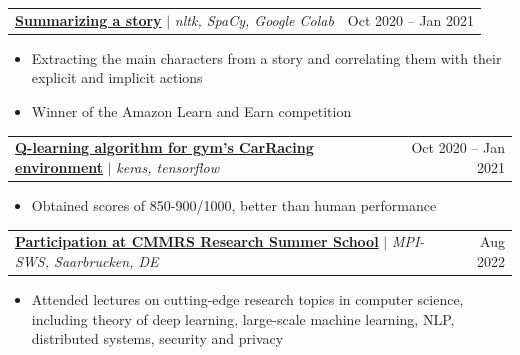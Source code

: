 \documentclass[letterpaper,11pt]{article}
\makeatletter
\newcommand{\resumeItem}[1]{
  \item\small{
    {#1 \vspace{-2pt}}
  }
}
\newcommand{\resumeProjectHeading}[2]{
    \item
    \begin{tabular*}{0.97\textwidth}{l@{\extracolsep{\fill}}r}
      \small#1 & #2 \\
    \end{tabular*}\vspace{-7pt}
}
\newcommand{\resumeItemListStart}{\begin{itemize}}
\newcommand{\resumeItemListEnd}{\end{itemize}\vspace{-5pt}}
\makeatother
\begin{document}

        
    \resumeProjectHeading
        {\textbf{\href{ https://colab.research.google.com/drive/1_yDVONNKSRI_GoF7pYY1lVmAcwNZGF8n?usp=sharing}{Summarizing a story}}  $|$ \emph{nltk, SpaCy, Google Colab}}{Oct 2020 -- Jan 2021}
        \resumeItemListStart
            \resumeItem{Extracting the main characters from a story and correlating them with their explicit and implicit actions}
            \resumeItem{Winner of the Amazon Learn and Earn competition}
        \resumeItemListEnd

    \resumeProjectHeading
        {\textbf{\href{ https://github.com/stefanrzv2000/gym}{Q-learning algorithm for gym's CarRacing environment}}  $|$ \emph{keras, tensorflow}}{Oct 2020 -- Jan 2021}
        \resumeItemListStart
            \resumeItem{Obtained scores of 850-900/1000, better than human performance}
        \resumeItemListEnd

    \resumeProjectHeading
        {\textbf{\href{https://cmmrs.mpi-sws.org/}{Participation at CMMRS Research Summer School}} $|$ \emph{MPI-SWS, Saarbrucken, DE}}{Aug 2022}
        \resumeItemListStart
            \resumeItem{Attended lectures on cutting-edge research topics in computer science, including theory of deep learning, large-scale machine learning, NLP, distributed systems, security and privacy}
        \resumeItemListEnd
      
    
\end{document}
